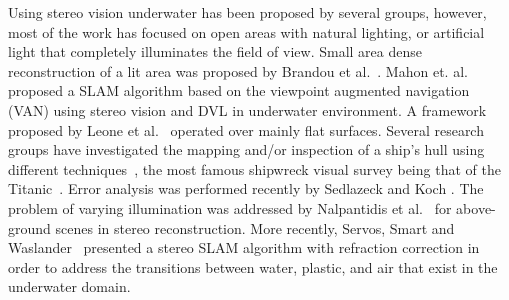 Using stereo vision underwater has been proposed by several groups, however, most of the work has focused on open areas with natural lighting, or artificial light that completely illuminates the field of view. Small area dense reconstruction of a lit area was  proposed by Brandou et al.~\cite{Brandou2007}. Mahon et. al.~\cite{mahon2008efficient} proposed a SLAM algorithm based on the viewpoint augmented navigation (VAN) using stereo vision and DVL in underwater environment. A framework proposed by Leone et al.~\cite{Leone2008} operated over mainly flat surfaces. Several research groups have investigated the mapping and/or inspection of a ship's hull using different techniques~\cite{Hogue2007,Hover2007,Englot2013,akim-2013a}, the most famous shipwreck visual survey being that of the Titanic~\cite{Eustice2006}. Error analysis was performed recently by Sedlazeck and Koch \cite{Sedlazeck2012}. The problem of varying illumination was addressed by Nalpantidis et al.~\cite{Nalpantidis2010} for above\hyp ground scenes in stereo reconstruction. More recently, Servos, Smart and Waslander~\cite{Servos2013} presented a stereo SLAM algorithm with refraction correction in order to address the transitions between water, plastic, and air that exist in the underwater domain.